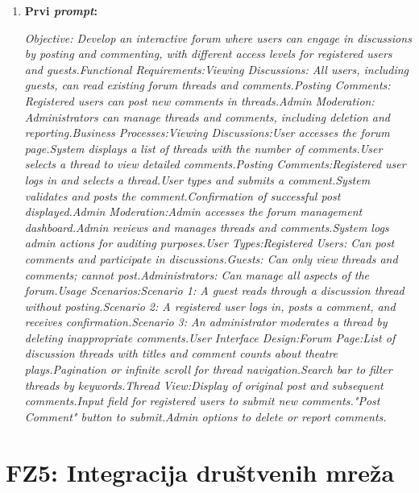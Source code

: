 \begin{enumerate}[itemsep=1ex]
    \item \textbf{Prvi \textit{prompt}:}

         \textit{Objective: Develop an interactive forum where users can engage in discussions by posting and commenting, with different access levels for registered users and guests.Functional Requirements:Viewing Discussions: All users, including guests, can read existing forum threads and comments.Posting Comments: Registered users can post new comments in threads.Admin Moderation: Administrators can manage threads and comments, including deletion and reporting.Business Processes:Viewing Discussions:User accesses the forum page.System displays a list of threads with the number of comments.User selects a thread to view detailed comments.Posting Comments:Registered user logs in and selects a thread.User types and submits a comment.System validates and posts the comment.Confirmation of successful post displayed.Admin Moderation:Admin accesses the forum management dashboard.Admin reviews and manages threads and comments.System logs admin actions for auditing purposes.User Types:Registered Users: Can post comments and participate in discussions.Guests: Can only view threads and comments; cannot post.Administrators: Can manage all aspects of the forum.Usage Scenarios:Scenario 1: A guest reads through a discussion thread without posting.Scenario 2: A registered user logs in, posts a comment, and receives confirmation.Scenario 3: An administrator moderates a thread by deleting inappropriate comments.User Interface Design:Forum Page:List of discussion threads with titles and comment counts about theatre plays.Pagination or infinite scroll for thread navigation.Search bar to filter threads by keywords.Thread View:Display of original post and subsequent comments.Input field for registered users to submit new comments."Post Comment" button to submit.Admin options to delete or report comments.}
\end{enumerate}



\sloppy  
\section{FZ5: Integracija društvenih mreža}  

\sloppy  
